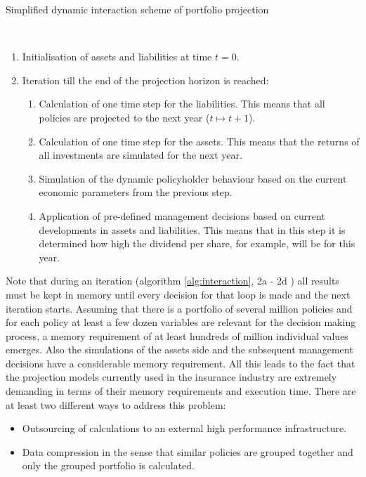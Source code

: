 \begin{algorithm}
	\caption{Simplified dynamic interaction scheme of portfolio projection}\label{alg:interaction}
	\begin{algorithmic}
		\\
		\begin{enumerate}
			\item Initialisation of assets and liabilities at time $t = 0$.
			\item  Iteration till the end of the projection horizon is reached:
			\begin{enumerate}[label=\emph{\alph*})]
				\item Calculation of one time step for the liabilities. This means that all policies are projected to the next year ($t \mapsto t+1$). 
				\item Calculation of one time step for the assets. This means that the returns of all investments are simulated for the next year.
				\item Simulation of the dynamic policyholder behaviour based on the current economic parameters from the previous step.
				\item Application of pre-defined management decisions based on current developments in assets and liabilities. This means that in this step it is determined how high the dividend per share, for example, will be for this year. 
			\end{enumerate}
		\end{enumerate}
	\end{algorithmic}
\end{algorithm}

Note that during an iteration (algorithm \ref{alg:interaction}, 2a - 2d ) all results must be kept in memory until every decision for that loop is made and the next iteration starts. Assuming that there is a portfolio of several million policies and for each policy at least a few dozen variables are relevant for the decision making process, a memory requirement of at least hundreds of million individual values emerges. Also the simulations of the assets side and the subsequent management decisions have a considerable memory requirement. All this leads to the fact that the projection models currently used in the insurance industry are extremely demanding in terms of their memory requirements and execution time. There are at least two different ways to address this problem:

\begin{itemize}
	\item Outsourcing of calculations to an external high performance infrastructure.
	\item Data compression in the sense that similar policies are grouped together and only the grouped portfolio is calculated.
\end{itemize}

